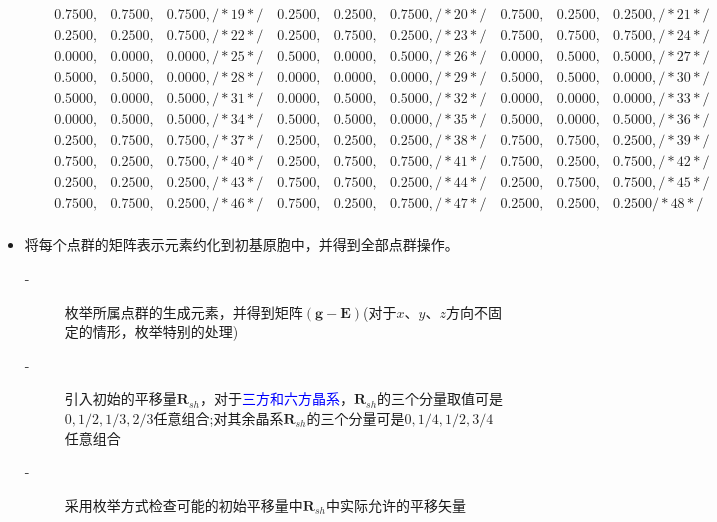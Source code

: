 \documentclass{article}      %
\begin{document}
\begin{itemize}
\begin{enumerate}
\begin{displaymath}
\begin{matrix}
     0.7500, & 0.7500, & 0.7500, /*    19  */\quad 0.2500, & 0.2500, & 0.7500, /*    20  */\quad 0.7500, & 0.2500, & 0.2500, /*    21  */\\
     0.2500, & 0.2500, & 0.7500, /*    22  */\quad 0.2500, & 0.7500, & 0.2500, /*    23  */\quad 0.7500, & 0.7500, & 0.7500, /*    24  */\\
     0.0000, & 0.0000, & 0.0000, /*    25  */\quad 0.5000, & 0.0000, & 0.5000, /*    26  */\quad 0.0000, & 0.5000, & 0.5000, /*    27  */\\
     0.5000, & 0.5000, & 0.0000, /*    28  */\quad 0.0000, & 0.0000, & 0.0000, /*    29  */\quad 0.5000, & 0.5000, & 0.0000, /*    30  */\\
     0.5000, & 0.0000, & 0.5000, /*    31  */\quad 0.0000, & 0.5000, & 0.5000, /*    32  */\quad 0.0000, & 0.0000, & 0.0000, /*    33  */\\
     0.0000, & 0.5000, & 0.5000, /*    34  */\quad 0.5000, & 0.5000, & 0.0000, /*    35  */\quad 0.5000, & 0.0000, & 0.5000, /*    36  */\\
     0.2500, & 0.7500, & 0.7500, /*    37  */\quad 0.2500, & 0.2500, & 0.2500, /*    38  */\quad 0.7500, & 0.7500, & 0.2500, /*    39  */\\
     0.7500, & 0.2500, & 0.7500, /*    40  */\quad 0.2500, & 0.7500, & 0.7500, /*    41  */\quad 0.7500, & 0.2500, & 0.7500, /*    42  */\\
     0.2500, & 0.2500, & 0.2500, /*    43  */\quad 0.7500, & 0.7500, & 0.2500, /*    44  */\quad 0.2500, & 0.7500, & 0.7500, /*    45  */\\
     0.7500, & 0.7500, & 0.2500, /*    46  */\quad 0.7500, & 0.2500, & 0.7500, /*    47  */\quad 0.2500, & 0.2500, & 0.2500  /*    48  */\\
					\end{matrix}
				\end{displaymath}
		\end{enumerate}
	\item 将每个点群的矩阵表示元素约化到初基原胞中，并得到全部点群操作。
		\begin{description}
			\item[-] 枚举所属点群的生成元素，并得到矩阵$(\mathbf{g}-\mathbf{E})$(对于$x$、$y$、$z$方向不固定的情形，枚举特别的处理)
			\item[-] 引入初始的平移量$\mathbf{R}_{sh}$，对于\textcolor{blue}{三方和六方晶系}，$\mathbf{R}_{sh}$的三个分量取值可是$0,1/2,1/3,2/3$任意组合;对其余晶系$\mathbf{R}_{sh}$的三个分量可是$0,1/4,1/2,3/4$任意组合
			\item[-]采用枚举方式检查可能的初始平移量中$\mathbf{R}_{sh}$中实际允许的平移矢量\\

\end{description}
\end{itemize}
\end{document}
